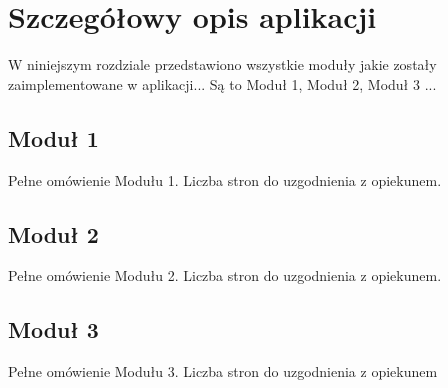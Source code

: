 \section{Szczegółowy opis aplikacji}
W niniejszym rozdziale przedstawiono wszystkie moduły jakie zostały zaimplementowane
w aplikacji... Są to Moduł 1, Moduł 2, Moduł 3 ...
\subsection{Moduł 1}
Pełne omówienie Modułu 1. Liczba stron do uzgodnienia z opiekunem.
\subsection{Moduł 2}
Pełne omówienie Modułu 2. Liczba stron do uzgodnienia z opiekunem.
\subsection{Moduł 3}
Pełne omówienie Modułu 3. Liczba stron do uzgodnienia z opiekunem
